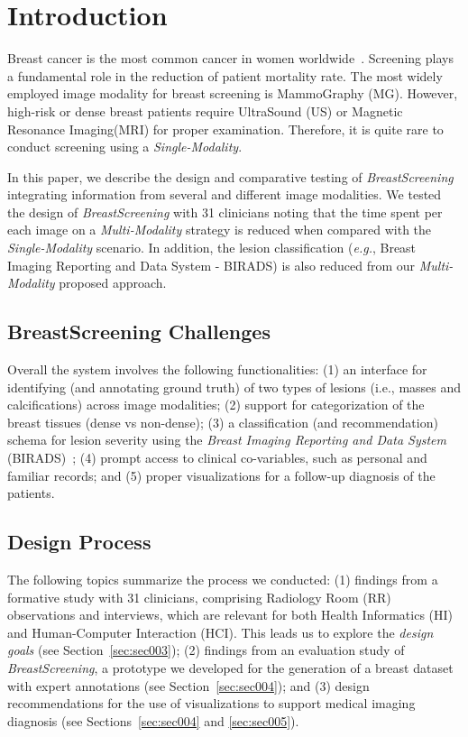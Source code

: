 \section{Introduction}
\label{sec:sec001}

Breast cancer is the most common cancer in women worldwide~\cite{henriksen2018efficacy}.
Screening plays a fundamental role in the reduction of patient mortality rate.
The most widely employed image modality for breast screening is MammoGraphy (MG).
However, high-risk or dense breast patients require UltraSound (US) or Magnetic Resonance Imaging\footnotemark[1] (MRI) for proper examination.
Therefore, it is quite rare to conduct screening using a \textit{Single-Modality}.

In this paper, we describe the design and comparative testing of {\it BreastScreening} integrating information from several and different image modalities.
We tested the design of {\it BreastScreening} with 31 clinicians noting that the time spent per each image on a \textit{Multi-Modality} strategy is reduced when compared with the \textit{Single-Modality} scenario.
In addition, the lesion classification ({\em e.g.}, Breast Imaging Reporting and Data System - BIRADS) is also reduced from our \textit{Multi-Modality} proposed approach.

\subsection{BreastScreening Challenges}

Overall the system involves the  following functionalities:
(1) an interface for identifying (and annotating ground truth) of two types of lesions (i.e., masses and calcifications) across image modalities;
(2) support for categorization of the breast tissues (dense vs non-dense);
(3) a classification (and recommendation) schema for lesion severity using the {\em Breast Imaging Reporting and Data System} (BIRADS)~\cite{aghaei2018association};
(4) prompt access to clinical co-variables, such as personal and familiar records; and
(5) proper visualizations for a follow-up diagnosis of the patients.

\subsection{Design Process}

The following topics summarize the process we conducted:
(1) findings from a formative study with 31 clinicians, comprising Radiology Room (RR) observations and interviews, which are relevant for both Health Informatics (HI) and Human-Computer Interaction (HCI).
This leads us to explore the {\it design goals} (see Section~\ref{sec:sec003});
(2) findings from an evaluation study of {\it BreastScreening}, a prototype we developed for the generation of a breast dataset with expert annotations (see Section~\ref{sec:sec004}); and
(3) design recommendations for the use of visualizations to support medical imaging diagnosis (see Sections~\ref{sec:sec004} and \ref{sec:sec005}).

